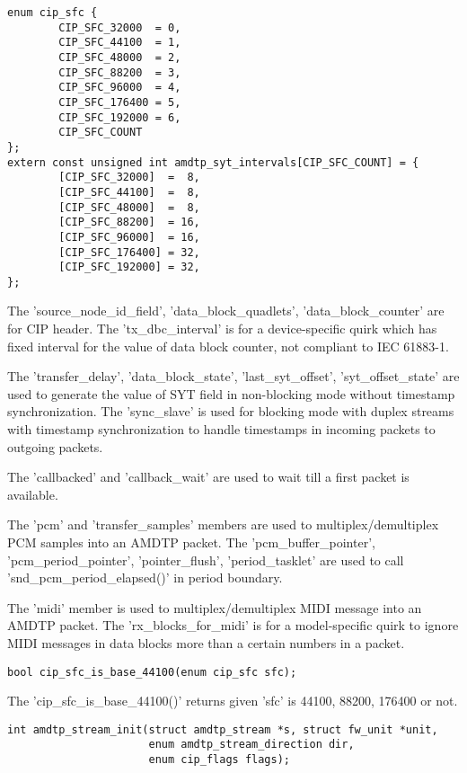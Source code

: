 \documentclass[onecolumn]{article}
\begin{document}
\begin{verbatim}
enum cip_sfc {
        CIP_SFC_32000  = 0,
        CIP_SFC_44100  = 1,
        CIP_SFC_48000  = 2,
        CIP_SFC_88200  = 3,
        CIP_SFC_96000  = 4,
        CIP_SFC_176400 = 5,
        CIP_SFC_192000 = 6,
        CIP_SFC_COUNT
};
extern const unsigned int amdtp_syt_intervals[CIP_SFC_COUNT] = {
        [CIP_SFC_32000]  =  8,
        [CIP_SFC_44100]  =  8,
        [CIP_SFC_48000]  =  8,
        [CIP_SFC_88200]  = 16,
        [CIP_SFC_96000]  = 16,
        [CIP_SFC_176400] = 32,
        [CIP_SFC_192000] = 32,
};
\end{verbatim}


The 'source\_node\_id\_field', 'data\_block\_quadlets', 'data\_block\_counter' are for CIP header. The 'tx\_dbc\_interval' is for a device-specific quirk which has fixed interval for the value of data block counter, not compliant to IEC 61883-1.

The 'transfer\_delay', 'data\_block\_state', 'last\_syt\_offset', 'syt\_offset\_state' are used to generate the value of SYT field in non-blocking mode without timestamp synchronization. The 'sync\_slave' is used for blocking mode with duplex streams with timestamp synchronization to handle timestamps in incoming packets to outgoing packets.

The 'callbacked' and 'callback\_wait' are used to wait till a first packet is available.

The 'pcm' and 'transfer\_samples' members are used to multiplex/demultiplex PCM samples into an AMDTP packet. The 'pcm\_buffer\_pointer', 'pcm\_period\_pointer', 'pointer\_flush', 'period\_tasklet' are used to call 'snd\_pcm\_period\_elapsed()' in period boundary.

The 'midi' member is used to multiplex/demultiplex MIDI message into an AMDTP packet. The 'rx\_blocks\_for\_midi' is for a model-specific quirk to ignore MIDI messages in data blocks more than a certain numbers in a packet.

\begin{verbatim}
bool cip_sfc_is_base_44100(enum cip_sfc sfc);
\end{verbatim}

The 'cip\_sfc\_is\_base\_44100()' returns given 'sfc' is 44100, 88200, 176400 or not.

\begin{verbatim}
int amdtp_stream_init(struct amdtp_stream *s, struct fw_unit *unit,
                      enum amdtp_stream_direction dir,
                      enum cip_flags flags);
\end{verbatim}
\end{document}
